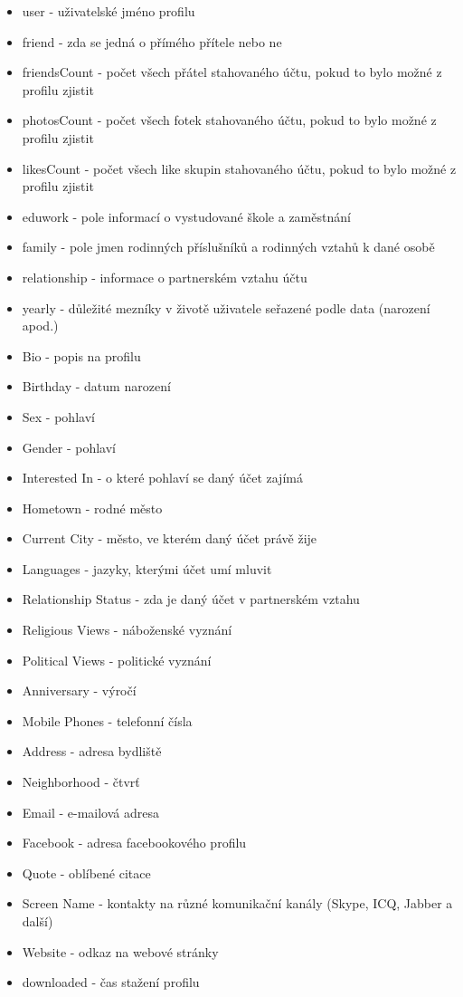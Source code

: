 \documentclass[thesis=M,czech]{FITthesis}[2013/05/10]
\begin{document}
\begin{itemize}
  \item user - uživatelské jméno profilu
  \item friend - zda se jedná o přímého přítele nebo ne
  \item friendsCount - počet všech přátel stahovaného účtu, pokud to bylo možné z profilu zjistit
  \item photosCount - počet všech fotek stahovaného účtu, pokud to bylo možné z profilu zjistit
  \item likesCount - počet všech like skupin stahovaného účtu, pokud to bylo možné z profilu zjistit
  \item eduwork - pole informací o vystudované škole a zaměstnání
  \item family - pole jmen rodinných příslušníků a rodinných vztahů k dané osobě
  \item relationship - informace o partnerském vztahu účtu
  \item yearly - důležité mezníky v životě uživatele seřazené podle data (narození apod.)
  \item Bio - popis na profilu
  \item Birthday - datum narození 
  \item Sex - pohlaví
  \item Gender - pohlaví
  \item Interested In - o které pohlaví se daný účet zajímá
  \item Hometown - rodné město
  \item Current City - město, ve kterém daný účet právě žije
  \item Languages - jazyky, kterými účet umí mluvit
  \item Relationship Status - zda je daný účet v partnerském vztahu
  \item Religious Views - náboženské vyznání
  \item Political Views - politické vyznání
  \item Anniversary - výročí
  \item Mobile Phones - telefonní čísla
  \item Address - adresa bydliště
  \item Neighborhood - čtvrť
  \item Email - e-mailová adresa
  \item Facebook - adresa facebookového profilu
  \item Quote - oblíbené citace
  \item Screen Name - kontakty na různé komunikační kanály (Skype, ICQ, Jabber a další)
  \item Website - odkaz na webové stránky
  \item downloaded - čas stažení profilu
\end{itemize}
\end{document}
